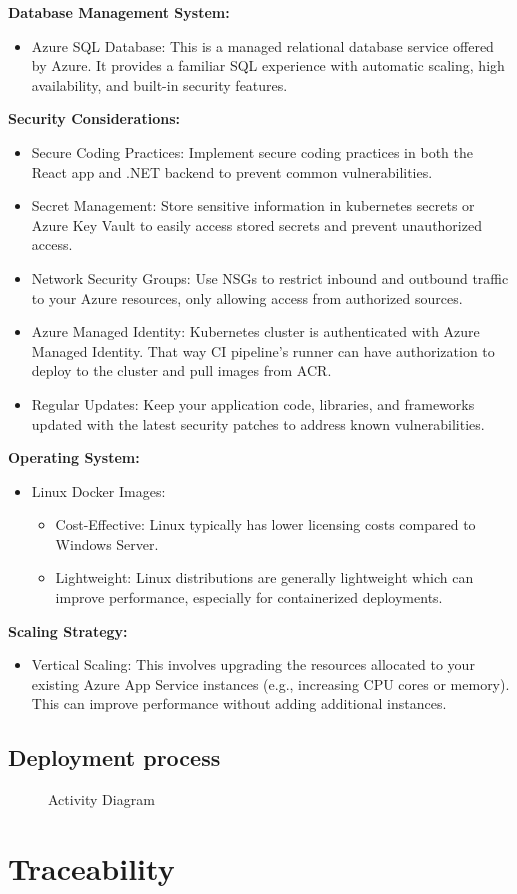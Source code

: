 \documentclass[
    english, %
]{VUMIFPSkursinis}
\begin{document}
\textbf{Database Management System:}
\begin{itemize}
    \item Azure SQL Database: This is a managed relational database service offered by Azure. It provides a familiar SQL experience with automatic scaling, high availability, and built-in security features.
\end{itemize}

\textbf{Security Considerations:}
\begin{itemize}
    \item Secure Coding Practices: Implement secure coding practices in both the React app and .NET backend to prevent common vulnerabilities.
    \item Secret Management: Store sensitive information in kubernetes secrets or Azure Key Vault to easily access stored secrets and prevent unauthorized access.
    \item Network Security Groups: Use NSGs to restrict inbound and outbound traffic to your Azure resources, only allowing access from authorized sources.
    \item Azure Managed Identity: Kubernetes cluster is authenticated with Azure Managed Identity. That way CI pipeline's runner can have authorization to deploy to the cluster and pull images from ACR.
    \item Regular Updates: Keep your application code, libraries, and frameworks updated with the latest security patches to address known vulnerabilities.
\end{itemize}

\textbf{Operating System:}
\begin{itemize}
    \item Linux Docker Images:
        \begin{itemize}
            \item Cost-Effective: Linux typically has lower licensing costs compared to Windows Server.
            \item Lightweight: Linux distributions are generally lightweight which can improve performance, especially for containerized deployments.
        \end{itemize}
\end{itemize}

\textbf{Scaling Strategy:}
\begin{itemize}
    \item Vertical Scaling: This involves upgrading the resources allocated to your existing Azure App Service instances (e.g., increasing CPU cores or memory). This can improve performance without adding additional instances.
\end{itemize}

\subsection{Deployment process}

\begin{figure}[ht]
    \centering
    
    \label{activity-diagram}
    \caption{Activity Diagram}
\end{figure}

\section{Traceability}

\listoffigures
\printbibliography[heading=bibintoc]
\end{document}
